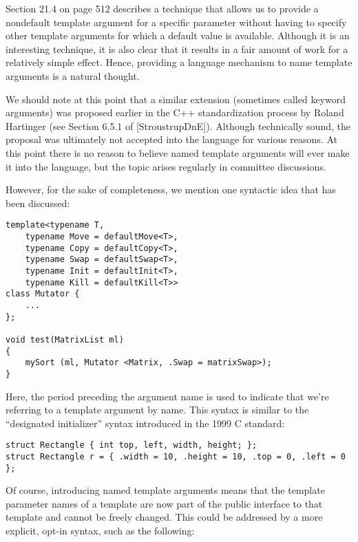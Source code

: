 Section 21.4 on page 512 describes a technique that allows us to provide a nondefault template argument for a specific parameter without having to specify other template arguments for which a default value is available. Although it is an interesting technique, it is also clear that it results in a fair amount of work for a relatively simple effect. Hence, providing a language mechanism to name template arguments is a natural thought.

We should note at this point that a similar extension (sometimes called keyword arguments) was proposed earlier in the C++ standardization process by Roland Hartinger (see Section 6.5.1 of [StroustrupDnE]). Although technically sound, the proposal was ultimately not accepted into the language for various reasons. At this point there is no reason to believe named template arguments will ever make it into the language, but the topic arises regularly in committee discussions.

However, for the sake of completeness, we mention one syntactic idea that has been discussed:

\begin{lstlisting}[style=styleCXX]
template<typename T,
	typename Move = defaultMove<T>,
	typename Copy = defaultCopy<T>,
	typename Swap = defaultSwap<T>,
	typename Init = defaultInit<T>,
	typename Kill = defaultKill<T>>
class Mutator {
	...
};

void test(MatrixList ml)
{
	mySort (ml, Mutator <Matrix, .Swap = matrixSwap>);
}
\end{lstlisting}

Here, the period preceding the argument name is used to indicate that we’re referring to a template argument by name. This syntax is similar to the “designated initializer” syntax introduced in the 1999 C standard:

\begin{lstlisting}[style=styleCXX]
struct Rectangle { int top, left, width, height; };
struct Rectangle r = { .width = 10, .height = 10, .top = 0, .left = 0 };
\end{lstlisting}

Of course, introducing named template arguments means that the template parameter names of a template are now part of the public interface to that template and cannot be freely changed. This could be addressed by a more explicit, opt-in syntax, such as the following:

